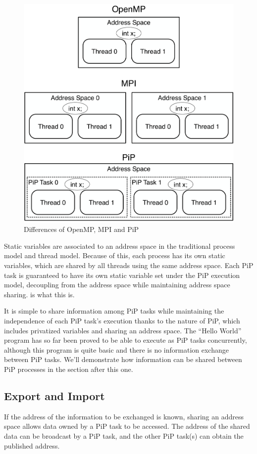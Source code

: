 \begin{figure}[ht]
\centering
\includegraphics[width=0.7\columnwidth]{tasks/Figs/AddressSpace-OpenMP-MPI-PiP.pdf}
\caption{Differences of OpenMP, MPI and PiP}
\label{fig:tasks:hello-var-omp}
\end{figure}

Static variables are associated to an address space in the traditional
process model and thread model. Because of this, each process has its
own static variables, which are shared by all threads using the same
address space. Each PiP task is guaranteed to have its own static
variable set under the PiP execution model, decoupling from the
address space while maintaining address space sharing. {\bf
  } is what this is.   

It is simple to share information among PiP tasks while maintaining
the independence of each PiP task's execution thanks to the nature of
PiP, which includes privatized variables and sharing an address
space. The ``Hello World'' program has so far been proved to be able to
execute as PiP tasks concurrently, although this program is quite
basic and there is no information exchange between PiP tasks. We'll
demonstrate how information can be shared between PiP processes in the
section after this one.

\subsection{Export and Import}

If the address of the information to be exchanged is known, sharing an
address space allows data owned by a PiP task to be accessed. The
address of the shared data can be broadcast by a PiP task, and the
other PiP task(s) can obtain the published address.  

